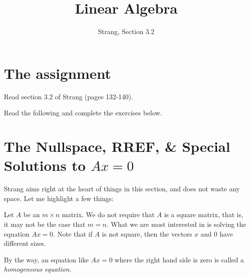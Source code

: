 \documentclass[11pt]{amsart}
\theoremstyle{definition}
\begin{document}
\title{Linear Algebra}
\author{Strang, Section 3.2}
\maketitle

\section{The assignment}
\begin{compactitem}
\item Read section 3.2 of Strang (pages 132-140).
\item Read the following and complete the exercises below.
\end{compactitem}


\section{The Nullspace, RREF, \& Special Solutions to $Ax=0$}

Strang aims right at the heart of things in this section, and does not waste any space. Let me highlight a few things:

Let $A$ be an $m\times n$ matrix. We do not require that $A$ is a square matrix, that is, it may not be the case that $m=n$. What we are most interested in is solving the equation $Ax = 0$. Note that if $A$ is not square, then the vectors $x$ and $0$ have different sizes.

By the way, an equation like $Ax=0$ where the right hand side is zero is called a \emph{homogeneous equation}.
\end{document}
